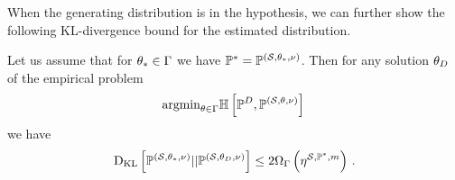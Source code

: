When the generating distribution is in the hypothesis, we can further show the following KL-divergence bound for the estimated distribution.

\begin{theorem}
    Let us assume that for $\theta_{*}\in\Gamma$ we have $\mathbb{P}^*=\mathbb{P}^{(\mathcal{S},\theta_{*},\nu)}$. %
    Then for any solution $\theta_{D}$ of the empirical problem
    \begin{align*}
        \mathrm{argmin}_{\theta\in\Gamma} \mathbb{H}\left[\mathbb{P}^{D},\mathbb{P}^{(\mathcal{S},\theta,\nu)}\right] \,
    \end{align*}
    we have
    \begin{align}
        \mathrm{D}_{\mathrm{KL}}\left[ \mathbb{P}^{(\mathcal{S},\theta_{*},\nu)} || \mathbb{P}^{(\mathcal{S},\theta_{D},\nu)} \right] \leq 2\Omega_{\Gamma}\left(\eta^{\mathcal{S},\mathbb{P}^*,m}\right) \, .
    \end{align}
\end{theorem}
